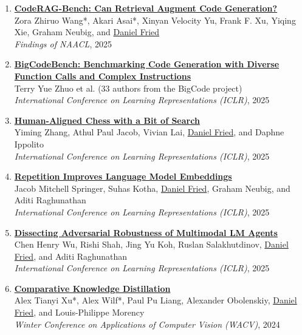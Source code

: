 \begin{enumerate}[leftmargin=-1mm,partopsep=0pt]
\item \href{https://arxiv.org/abs/2406.14497}{\textbf{{CodeRAG-Bench}: Can Retrieval Augment Code Generation?}} \\
  Zora Zhiruo Wang*, Akari Asai*, Xinyan Velocity Yu, Frank F. Xu, Yiqing Xie, Graham Neubig, and \underline{Daniel Fried}\\
  \emph{Findings of NAACL}, 2025

\item \href{https://arxiv.org/abs/2406.15877}{\textbf{{BigCodeBench}: Benchmarking Code Generation with Diverse Function Calls and Complex Instructions}} \\
  Terry Yue Zhuo et al. (33 authors from the BigCode project)\\
  \emph{International Conference on Learning Representations (ICLR)}, 2025

\item \href{https://arxiv.org/abs/2410.03893}{\textbf{Human-Aligned Chess with a Bit of Search}} \\
  Yiming Zhang, Athul Paul Jacob, Vivian Lai, \underline{Daniel Fried}, and Daphne Ippolito\\
  \emph{International Conference on Learning Representations (ICLR)}, 2025

\item \href{https://arxiv.org/abs/2402.15449}{\textbf{Repetition Improves Language Model Embeddings}} \\
  Jacob Mitchell Springer, Suhas Kotha, \underline{Daniel Fried}, Graham Neubig, and Aditi Raghunathan\\
  \emph{International Conference on Learning Representations (ICLR)}, 2025

\item \href{https://arxiv.org/abs/2406.12814}{\textbf{Dissecting Adversarial Robustness of Multimodal LM Agents}} \\
  Chen Henry Wu, Rishi Shah, Jing Yu Koh, Ruslan Salakhutdinov, \underline{Daniel Fried}, and Aditi Raghunathan\\
  \emph{International Conference on Learning Representations (ICLR)}, 2025

\item \href{https://arxiv.org/abs/2311.02253}{\textbf{Comparative Knowledge Distillation}} \\
  Alex Tianyi Xu*, Alex Wilf*, Paul Pu Liang, Alexander Obolenskiy, \underline{Daniel Fried}, and Louis-Philippe Morency\\
  \emph{Winter Conference on Applications of Computer Vision (WACV)}, 2024


\end{enumerate}
